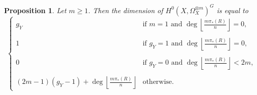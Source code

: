 \documentclass[11pt]{article} %
\newtheorem{prop}{Proposition}
\theoremstyle{remark}\newtheorem*{rem}{Remark}
\begin{document}
  \begin{prop}\label{dim}
    Let $m\geq 1$. Then the dimension of $H^0(X,\Omega_X^{\otimes m})^G$ is equal to
	\begin{equation*}
	   \begin{cases}
	    g_Y & \mbox{if } m=1 \mbox{ and } \deg\left\lfloor\frac{m\pi_*(R)}{n}\right\rfloor = 0, \\
\\
	    1 & \mbox{if } g_Y=1 \mbox{ and } \deg\left\lfloor\frac{m\pi_*(R)}{n}\right\rfloor = 0, \\ 
\\
	    0 & \mbox{if } g_Y=0 \mbox{ and } \deg\left\lfloor\frac{m\pi_*(R)}{n}\right\rfloor < 2m, \\
\\
	    (2m-1)(g_Y-1) + \deg\left\lfloor\frac{m\pi_*(R)}{n} \right\rfloor & \mbox{otherwise}.
	  \end{cases}
      \end{equation*}
  \end{prop}
\end{document}
